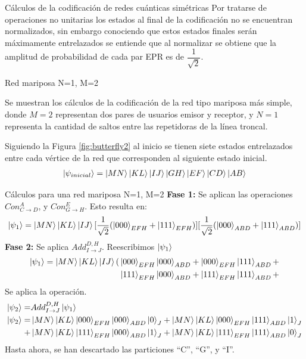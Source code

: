 \documentclass[10pt]{beamer}
\renewenvironment{block}[1]
    {\begin{oldblock}{#1}
        \smallskip
    }
    {
    \end{oldblock}
    }
\begin{document}
\begin{frame}{Cálculos de la codificación de redes cuánticas simétricas}
  Por tratarse de operaciones no unitarias los estados al final de la codificación no se encuentran normalizados, sin embargo conociendo que estos estados finales serán máximamente entrelazados se entiende que al normalizar se obtiene que la amplitud de probabilidad de cada par EPR es de $\dfrac{1}{\sqrt{2}}$.
  \begin{block}{Red mariposa N=1, M=2}
    Se muestran los cálculos de la codificación de la red tipo mariposa más simple, donde $M=2$ representan dos pares de usuarios emisor y receptor, y $N=1$ representa la cantidad de saltos entre las repetidoras de la línea troncal. \par
    Siguiendo la Figura \ref{fig:butterfly2} al inicio se tienen siete estados entrelazados entre cada vértice de la red que corresponden al siguiente estado inicial.
    \begin{align*}
      \ket{\psi_{inicial}} = \ket{MN}\ket{KL}\ket{IJ}\ket{GH}\ket{EF}\ket{CD}\ket{AB}
    \end{align*}
  \end{block}
\end{frame}

\begin{frame}{Cálculos para una red mariposa N=1, M=2}
  \textbf{Fase 1:} Se aplican las operaciones $Con^{A}_{C \rightarrow D}$, y $Con^{E}_{G \rightarrow H}$. Esto resulta en:
  \begin{align*}
  \ket{\psi_{1}} = \ket{MN} \ket{KL} \ket{IJ} 
  [\frac{1}{\sqrt{2}} (\ket{000}_{EFH} + \ket{111}_{EFH})] 
  [\frac{1}{\sqrt{2}} (\ket{000}_{ABD} + \ket{111}_{ABD})] 
  \end{align*}
  \textbf{Fase 2:} Se aplica $ Add^{D,H}_{I \rightarrow J} $. Reescribimos $\ket{\psi_{1}}$
\begin{align*}
\ket{\psi_{1}}=\ket{MN}\ket{KL}\ket{IJ} ( 
& \ket{000}_{EFH}\ket{000}_{ABD} + \ket{000}_{EFH}\ket{111}_{ABD} + \\
& \ket{111}_{EFH}\ket{000}_{ABD} + \ket{111}_{EFH}\ket{111}_{ABD} + 
\end{align*}
Se aplica la operación.
\begin{align*}
\ket{\psi_{2}} =& Add^{D,H}_{I \rightarrow J}  \ket{\psi_{1}} \\
\ket{\psi_{2}} =& 
\ket{MN} \ket{KL} \ket{000}_{EFH}\ket{000}_{ABD}\ket{0}_J +\ket{MN}\ket{KL}\ket{000}_{EFH}\ket{111}_{ABD} \ket{1}_J \\
+& \ket{MN} \ket{KL} \ket{111}_{EFH}\ket{000}_{ABD}\ket{1}_J +\ket{MN}\ket{KL}\ket{111}_{EFH}\ket{111}_{ABD} \ket{0}_J
\end{align*}
\alert{Hasta ahora, se han descartado las particiones ``C'', ``G'', y ``I''.}
\end{frame}
\end{document}

